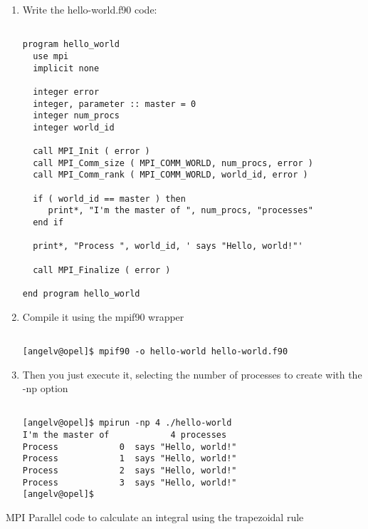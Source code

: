 \begin{enumerate}

\item Write the hello-world.f90 code:

\begin{verbatim}

program hello_world
  use mpi
  implicit none

  integer error
  integer, parameter :: master = 0
  integer num_procs
  integer world_id

  call MPI_Init ( error )
  call MPI_Comm_size ( MPI_COMM_WORLD, num_procs, error )
  call MPI_Comm_rank ( MPI_COMM_WORLD, world_id, error )

  if ( world_id == master ) then
     print*, "I'm the master of ", num_procs, "processes"
  end if

  print*, "Process ", world_id, ' says "Hello, world!"'

  call MPI_Finalize ( error )

end program hello_world
\end{verbatim}

\item Compile it using the mpif90 wrapper

\begin{verbatim}  

[angelv@opel]$ mpif90 -o hello-world hello-world.f90
\end{verbatim}

\item Then you just execute it, selecting the number of processes to create with
  the -np option

\begin{verbatim}

[angelv@opel]$ mpirun -np 4 ./hello-world
I'm the master of            4 processes
Process            0  says "Hello, world!"
Process            1  says "Hello, world!"
Process            2  says "Hello, world!"
Process            3  says "Hello, world!"
[angelv@opel]$
\end{verbatim}

\end{enumerate}






 {MPI Parallel code to calculate an integral using the trapezoidal rule}
\label{sec:trapezoidal-rule}

